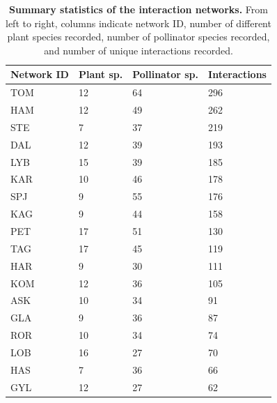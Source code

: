 \begin{table}
\centering
\caption{\textbf{Summary statistics of the interaction networks.} From left to right, columns indicate network ID, number of different plant species recorded, number of pollinator species recorded, and number of unique interactions recorded.}
\label{tab:network_summary}
\begin{tabular}{llll}
\toprule
Network ID & Plant sp. & Pollinator sp. & Interactions \\
\midrule
       TOM &        12 &             64 &          296 \\
       HAM &        12 &             49 &          262 \\
       STE &         7 &             37 &          219 \\
       DAL &        12 &             39 &          193 \\
       LYB &        15 &             39 &          185 \\
       KAR &        10 &             46 &          178 \\
       SPJ &         9 &             55 &          176 \\
       KAG &         9 &             44 &          158 \\
       PET &        17 &             51 &          130 \\
       TAG &        17 &             45 &          119 \\
       HAR &         9 &             30 &          111 \\
       KOM &        12 &             36 &          105 \\
       ASK &        10 &             34 &           91 \\
       GLA &         9 &             36 &           87 \\
       ROR &        10 &             34 &           74 \\
       LOB &        16 &             27 &           70 \\
       HAS &         7 &             36 &           66 \\
       GYL &        12 &             27 &           62 \\
\bottomrule
\end{tabular}
\end{table}
